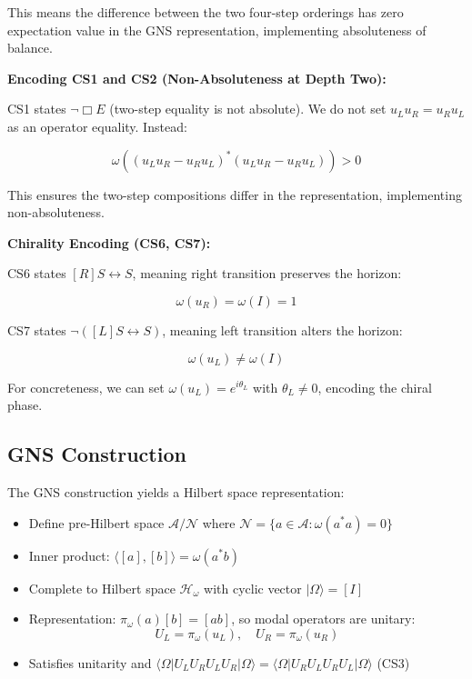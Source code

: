 \documentclass[11pt,a4paper]{article}
\theoremstyle{definition}
\theoremstyle{remark}
\begin{document}
This means the difference between the two four-step orderings has zero expectation value in the GNS representation, implementing absoluteness of balance.

\textbf{Encoding CS1 and CS2 (Non-Absoluteness at Depth Two):}

CS1 states $\neg\Box E$ (two-step equality is not absolute). We do not set $u_L u_R = u_R u_L$ as an operator equality. Instead:

\begin{equation}
\omega((u_L u_R - u_R u_L)^* (u_L u_R - u_R u_L)) > 0
\end{equation}

This ensures the two-step compositions differ in the representation, implementing non-absoluteness.

\textbf{Chirality Encoding (CS6, CS7):}

CS6 states $[R]S \leftrightarrow S$, meaning right transition preserves the horizon:

\begin{equation}
\omega(u_R) = \omega(I) = 1
\end{equation}

CS7 states $\neg([L]S \leftrightarrow S)$, meaning left transition alters the horizon:

\begin{equation}
\omega(u_L) \neq \omega(I)
\end{equation}

For concreteness, we can set $\omega(u_L) = e^{i\theta_L}$ with $\theta_L \neq 0$, encoding the chiral phase.

\subsection{GNS Construction}

The GNS construction yields a Hilbert space representation:
\begin{itemize}
\item Define pre-Hilbert space $\mathcal{A}/\mathcal{N}$ where $\mathcal{N} = \{a \in \mathcal{A} : \omega(a^*a) = 0\}$
\item Inner product: $\langle[a], [b]\rangle = \omega(a^* b)$
\item Complete to Hilbert space $\mathcal{H}_\omega$ with cyclic vector $|\Omega\rangle = [I]$
\item Representation: $\pi_\omega(a)[b] = [ab]$, so modal operators are unitary:
\[
U_L = \pi_\omega(u_L), \quad U_R = \pi_\omega(u_R)
\]
\item Satisfies unitarity and $\langle\Omega|U_L U_R U_L U_R|\Omega\rangle = \langle\Omega|U_R U_L U_R U_L|\Omega\rangle$ (CS3)
\end{itemize}
\end{document}
